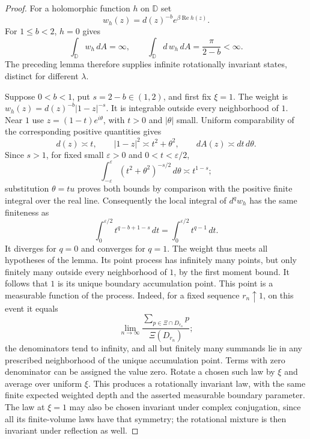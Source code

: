 \documentclass[11pt,a4paper]{article}
\numberwithin{equation}{section}
\theoremstyle{definition}
\theoremstyle{remark}
\newcommand{\D}{\mathbb D}
\begin{document}
\begin{proof}
For a holomorphic function $h$ on $\D$ set
\[
 w_h(z)=d(z)^{-b}e^{\beta\operatorname{Re}h(z)}.
\]
For $1\le b<2$, $h=0$ gives
\[
 \int_\D w_h\,dA=\infty,
 \qquad
 \int_\D d\,w_h\,dA=\frac\pi{2-b}<\infty.
\]
The preceding lemma therefore supplies infinite rotationally invariant
states, distinct for different $\lambda$.

Suppose $0<b<1$, put $s=2-b\in(1,2)$, and first fix $\xi=1$.  The
weight is $w_h(z)=d(z)^{-b}|1-z|^{-s}$.  It is integrable outside every
neighborhood of $1$.  Near $1$ use $z=(1-t)e^{i\theta}$, with $t>0$
and $|\theta|$ small.  Uniform comparability of the corresponding
positive quantities gives
\[
 d(z)\asymp t,\qquad |1-z|^2\asymp t^2+\theta^2,
 \qquad dA(z)\asymp dt\,d\theta.
\]
Since $s>1$, for fixed small $\varepsilon>0$ and $0<t<\varepsilon/2$,
\[
 \int_{-\varepsilon}^{\varepsilon}
          (t^2+\theta^2)^{-s/2}\,d\theta\asymp t^{1-s};
\]
substitution $\theta=tu$ proves both bounds by comparison with the
positive finite integral over the real line.  Consequently the local
integral of $d^qw_h$ has the same finiteness as
\[
 \int_0^{\varepsilon/2} t^{q-b+1-s}\,dt
       =\int_0^{\varepsilon/2}t^{q-1}\,dt.
\]
It diverges for $q=0$ and converges for $q=1$.  The weight thus meets
all hypotheses of the lemma.  Its point process has infinitely many
points, but only finitely many outside every neighborhood of $1$, by
the first moment bound.  It follows that $1$ is its unique boundary
accumulation point.  This point is a measurable function of the process.
Indeed, for a fixed sequence $r_n\uparrow1$, on this event it equals
\[
 \lim_{n\to\infty}
   \frac{\sum_{p\in\Xi\cap D_{r_n}}p}{\Xi(D_{r_n})};
\]
the denominators tend to infinity, and all but finitely many summands lie
in any prescribed neighborhood of the unique accumulation point.  Terms
with zero denominator can be assigned the value zero.
Rotate a chosen such law by $\xi$ and average over uniform $\xi$.  This produces a rotationally invariant law, with the
same finite expected weighted depth and the asserted measurable boundary
parameter.  The law at $\xi=1$ may also be chosen invariant under complex
conjugation, since all its finite-volume laws have that symmetry; the
rotational mixture is then invariant under reflection as well.


\end{proof}
\end{document}
